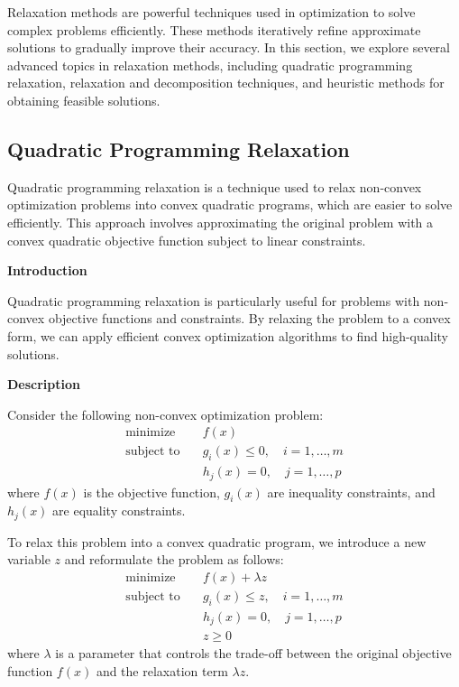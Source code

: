 \documentclass[12pt]{book} %
\begin{document}
Relaxation methods are powerful techniques used in optimization to solve complex problems efficiently. These methods iteratively refine approximate solutions to gradually improve their accuracy. In this section, we explore several advanced topics in relaxation methods, including quadratic programming relaxation, relaxation and decomposition techniques, and heuristic methods for obtaining feasible solutions.

\subsection{Quadratic Programming Relaxation}

Quadratic programming relaxation is a technique used to relax non-convex optimization problems into convex quadratic programs, which are easier to solve efficiently. This approach involves approximating the original problem with a convex quadratic objective function subject to linear constraints.

\textbf{Introduction}

Quadratic programming relaxation is particularly useful for problems with non-convex objective functions and constraints. By relaxing the problem to a convex form, we can apply efficient convex optimization algorithms to find high-quality solutions.

\textbf{Description}

Consider the following non-convex optimization problem:
\begin{align*}
\text{minimize} \quad & f(x) \\
\text{subject to} \quad & g_i(x) \leq 0, \quad i = 1, \ldots, m \\
& h_j(x) = 0, \quad j = 1, \ldots, p
\end{align*}
where \(f(x)\) is the objective function, \(g_i(x)\) are inequality constraints, and \(h_j(x)\) are equality constraints.

To relax this problem into a convex quadratic program, we introduce a new variable \(z\) and reformulate the problem as follows:
\begin{align*}
\text{minimize} \quad & f(x) + \lambda z \\
\text{subject to} \quad & g_i(x) \leq z, \quad i = 1, \ldots, m \\
& h_j(x) = 0, \quad j = 1, \ldots, p \\
& z \geq 0
\end{align*}
where \(\lambda\) is a parameter that controls the trade-off between the original objective function \(f(x)\) and the relaxation term \(\lambda z\).
\end{document}
